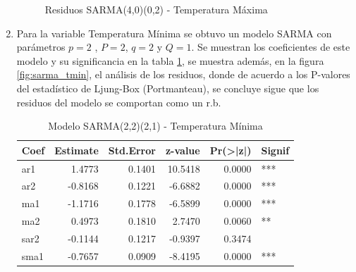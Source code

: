 \documentclass[12pt,oneside]{book}\usepackage[]{graphicx}\usepackage[]{color}
\newenvironment{knitrout}{}{} %
\theoremstyle{definition} %
\begin{document}
\begin{enumerate}
\begin{knitrout}
\begin{figure}[H]
{}

\caption{\label{fig:sarma_tmax} Residuos SARMA(4,0)(0,2) - Temperatura Máxima}\label{fig:unnamed-chunk-36}
\end{figure}


\end{knitrout}







\item Para la variable Temperatura Mínima se obtuvo un modelo SARMA con parámetros $p=2$ , $P=2$, $q=2$ y $Q=1$. Se muestran los coeficientes de este modelo y su significancia en la tabla \ref{tab:sarma_tmin}, se muestra además, en la figura \ref{fig:sarma_tmin}, el análisis de los residuos, donde de acuerdo a los P-valores del estadístico de Ljung-Box (Portmanteau), se concluye sigue que los residuos del modelo se comportan como un r.b.

\begin{knitrout}
\color{fgcolor}\begin{table}

\caption{\label{tab:model_x3}\label{tab:sarma_tmin}Modelo SARMA(2,2)(2,1) - Temperatura Mínima}
\centering
\begin{threeparttable}
\begin{tabular}[t]{lrrrrl}
\toprule
Coef & Estimate & Std.Error & z-value & Pr(>|z|) & Signif\\
\midrule
\rowcolor{gray!6}  ar1 & 1.4773 & 0.1401 & 10.5418 & 0.0000 & ***\\
ar2 & -0.8168 & 0.1221 & -6.6882 & 0.0000 & ***\\
\rowcolor{gray!6}  ma1 & -1.1716 & 0.1778 & -6.5899 & 0.0000 & ***\\
ma2 & 0.4973 & 0.1810 & 2.7470 & 0.0060 & **\\
\rowcolor{gray!6}  sar2 & -0.1144 & 0.1217 & -0.9397 & 0.3474 & \\
\addlinespace
sma1 & -0.7657 & 0.0909 & -8.4195 & 0.0000 & ***\\
\bottomrule
\end{tabular}
\end{threeparttable}
\end{table}



\end{knitrout}
\end{enumerate}
\end{document}
